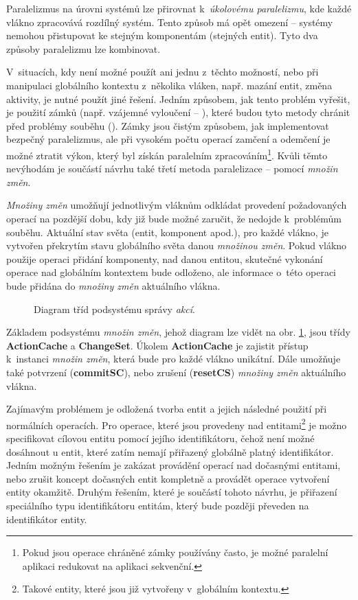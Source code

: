 Paralelizmus na úrovni systémů lze přirovnat k~\emph{úkolovému paralelizmu}, kde každé vlákno zpracovává rozdílný systém. Tento způsob má opět omezení -- systémy nemohou přistupovat ke stejným komponentám (stejných entit). Tyto dva způsoby paralelizmu lze kombinovat.

V~situacích, kdy není možné použít ani jednu z~těchto možností, nebo při manipulaci globálního kontextu z~několika vláken, např. mazání entit, změna aktivity, je nutné použít jiné řešení. Jedním způsobem, jak tento problém vyřešit, je použití zámků (např. vzájemné vyloučení -- ), které budou tyto metody chránit před problémy souběhu (). Zámky jsou čistým způsobem, jak implementovat bezpečný paralelizmus, ale při vysokém počtu operací zamčení a odemčení je možné ztratit výkon, který byl získán paralelním zpracováním\footnote{Pokud jsou operace chráněné zámky používány často, je možné paralelní aplikaci redukovat na aplikaci sekvenční.}. Kvůli těmto nevýhodám je součástí návrhu také třetí metoda paralelizace -- pomocí \emph{množin změn}.

\emph{Množiny změn} umožňují jednotlivým vláknům odkládat provedení požadovaných operací na pozdější dobu, kdy již bude možné zaručit, že nedojde k~problémům souběhu. Aktuální stav světa (entit, komponent apod.), pro každé vlákno, je vytvořen překrytím stavu globálního světa danou \emph{množinou změn}. Pokud vlákno použije operaci přidání komponenty, nad danou entitou, skutečné vykonání operace nad globálním kontextem bude odloženo, ale informace o~této operaci bude přidána do \emph{množiny změn} aktuálního vlákna.

\begin{figure}[H]
	\centering
	\caption{Diagram tříd podsystému správy \emph{akcí}.}
	\label{Fig:DESActionDiag}
\end{figure}

Základem podsystému \emph{množin změn}, jehož diagram lze vidět na obr. \ref{Fig:DESActionDiag}, jsou třídy \textbf{ActionCache} a \textbf{ChangeSet}. Úkolem \textbf{ActionCache} je zajistit přístup k~instanci \emph{množin změn}, která bude pro každé vlákno unikátní. Dále umožňuje také potvrzení (\textbf{commitSC}), nebo zrušení (\textbf{resetCS}) \emph{množiny změn} aktuálního vlákna. 

Zajímavým problémem je odložená tvorba entit a jejich následné použití při normálních operacích. Pro operace, které jsou provedeny nad  entitami\footnote{Takové entity, které jsou již vytvořeny v~globálním kontextu.} je možno specifikovat cílovou entitu pomocí jejího identifikátoru, čehož není možné dosáhnout u  entit, které zatím nemají přiřazený globálně platný identifikátor. Jedním možným řešením je zakázat provádění operací nad dočasnými entitami, nebo zrušit koncept dočasných entit kompletně a provádět operace vytvoření entity okamžitě. Druhým řešením, které je součástí tohoto návrhu, je přiřazení speciálního typu identifikátoru  entitám, který bude později převeden na identifikátor  entity.

